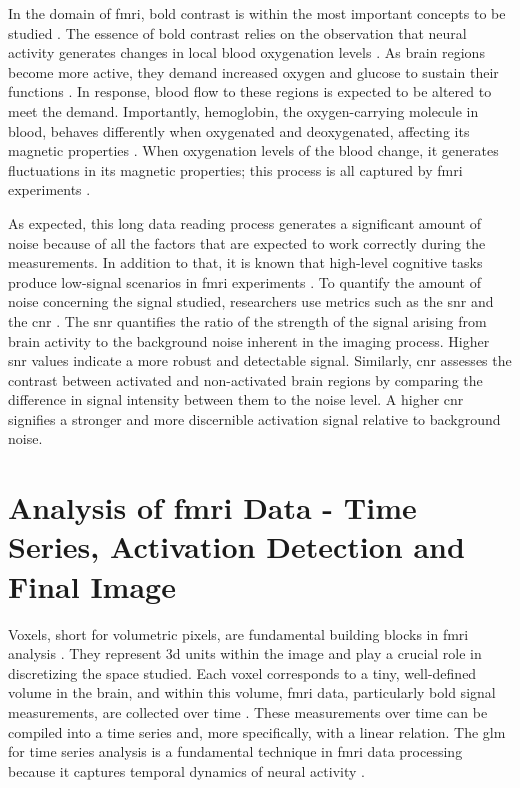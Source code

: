 In the domain of \gls{fmri}, \gls{bold} contrast is within the most important concepts to be studied \cite{logothetis2004nature}. The essence of \gls{bold} contrast relies on the observation that neural activity generates changes in local blood oxygenation levels \cite{lindquist2008rapid}. As brain regions become more active, they demand increased oxygen and glucose to sustain their functions \cite{lindquist2008statistical}. In response, blood flow to these regions is expected to be altered to meet the demand. Importantly, hemoglobin, the oxygen-carrying molecule in blood, behaves differently when oxygenated and deoxygenated, affecting its magnetic properties \cite{uyuklu2009effect, pauling1936magnetic, bren2015discovery}. When oxygenation levels of the blood change, it generates fluctuations in its magnetic properties; this process is all captured by \gls{fmri} experiments \cite{buxton2012dynamic}.

As expected, this long data reading process generates a significant amount of noise because of all the factors that are expected to work correctly during the measurements. In addition to that, it is known that high-level cognitive tasks produce low-signal scenarios in \gls{fmri} experiments \cite{cui2011quantitative}. To quantify the amount of noise concerning the signal studied, researchers use metrics such as the \gls{snr} and the \gls{cnr} \cite{welvaert2013definition}. The \gls{snr} quantifies the ratio of the strength of the signal arising from brain activity to the background noise inherent in the imaging process. Higher \gls{snr} values indicate a more robust and detectable signal. Similarly, \gls{cnr} assesses the contrast between activated and non-activated brain regions by comparing the difference in signal intensity between them to the noise level. A higher \gls{cnr} signifies a stronger and more discernible activation signal relative to background noise.

\section{Analysis of \gls{fmri} Data - Time Series, Activation Detection and Final Image}

Voxels, short for volumetric pixels, are fundamental building blocks in \gls{fmri} analysis \cite{norman2006beyond}. They represent \gls{3d} units within the image and play a crucial role in discretizing the space studied. Each voxel corresponds to a tiny, well-defined volume in the brain, and within this volume, \gls{fmri} data, particularly \gls{bold} signal measurements, are collected over time \cite{li2009voxel}. These measurements over time can be compiled into a time series and, more specifically, with a linear relation. The \gls{glm} for time series analysis is a fundamental technique in \gls{fmri} data processing because it captures temporal dynamics of neural activity \cite{kiebel2007general, friston1994statistical}.

